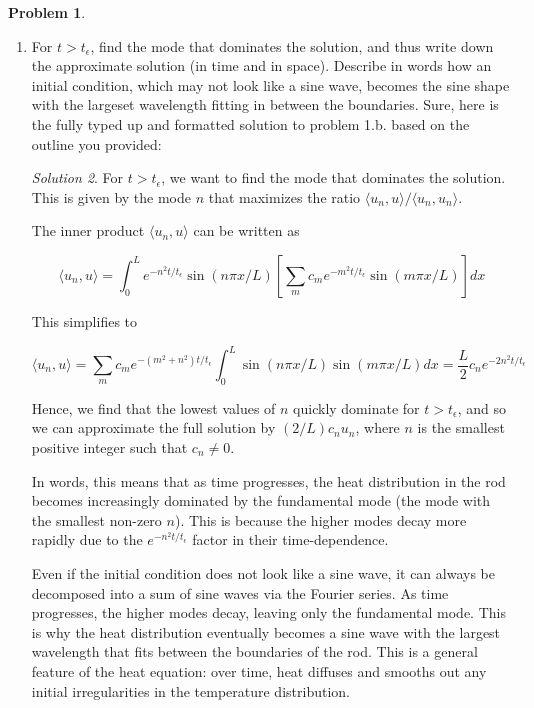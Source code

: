 \documentclass[12pt,a4paper]{article}
\theoremstyle{definition}
\newtheorem{problem}{Problem}
\theoremstyle{remark}
\newtheorem*{solution}{Solution}
\begin{document}
\begin{problem}
\begin{enumerate}[label=(\alph*)]
\begin{solution}
        $$u(x,t) = \sum_{n=1}^\infty c_n e^{-(\alpha n \pi / L)^2 t} \sin(n \pi x /L), \qquad c_n = \frac{2}{L} \int_0^L f(x) \sin(n \pi x / L) dx$$

        The time-dependence for the $n$-th standing mode is $\exp(-n^2(t/t_\epsilon))$, where $t_\epsilon \equiv (L/\pi \alpha)^2$.

        \end{solution}

        \item For $t > t_\epsilon$, find the mode that dominates the solution, and thus write down the approximate solution (in time and in space). Describe in words how an initial condition, which may not look like a sine wave, becomes the sine shape with the largeset wavelength fitting in between the boundaries. 
        Sure, here is the fully typed up and formatted solution to problem 1.b. based on the outline you provided:

        \begin{solution}
            For \(t > t_\epsilon\), we want to find the mode that dominates the solution. This is given by the mode \(n\) that maximizes the ratio \(\langle u_n , u \rangle / \langle u_n , u_n \rangle\). 

            The inner product \(\langle u_n , u \rangle\) can be written as 

            \[
            \langle u_n , u \rangle = \int_0^L e^{-n^2 t/t_\epsilon} \sin(n \pi x/L) \left[ \sum_m c_m e^{-m^2 t/t_\epsilon} \sin(m\pi x/L)\right]dx
            \]

            This simplifies to 

            \[
            \langle u_n , u \rangle = \sum_m c_m e^{-(m^2+n^2)t/t_\epsilon} \int_0^L \sin(n \pi x/L) \sin(m \pi x/L) dx = \frac{L}{2} c_n e^{-2n^2 t/t_\epsilon}
            \]

            Hence, we find that the lowest values of \(n\) quickly dominate for \(t > t_\epsilon\), and so we can approximate the full solution by \((2/L) c_n u_n\), where \(n\) is the smallest positive integer such that \(c_n \ne 0\). 

            In words, this means that as time progresses, the heat distribution in the rod becomes increasingly dominated by the fundamental mode (the mode with the smallest non-zero \(n\)). This is because the higher modes decay more rapidly due to the \(e^{-n^2 t/t_\epsilon}\) factor in their time-dependence. 

            Even if the initial condition does not look like a sine wave, it can always be decomposed into a sum of sine waves via the Fourier series. As time progresses, the higher modes decay, leaving only the fundamental mode. This is why the heat distribution eventually becomes a sine wave with the largest wavelength that fits between the boundaries of the rod. This is a general feature of the heat equation: over time, heat diffuses and smooths out any initial irregularities in the temperature distribution.
        \end{solution}
    \end{enumerate}
\end{problem}
\end{document}
